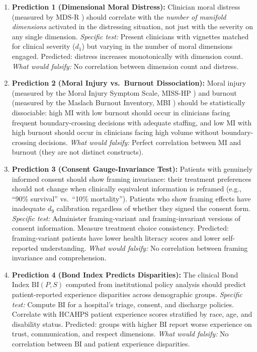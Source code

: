 \documentclass[12pt]{article}
\theoremstyle{definition}
\theoremstyle{remark}
\newcommand{\BI}{\mathrm{BI}}              %
\begin{document}
\begin{enumerate}
    \item \textbf{Prediction 1 (Dimensional Moral Distress):} Clinician moral distress (measured by MDS-R \cite{hamric2012}) should correlate with the \emph{number of manifold dimensions} activated in the distressing situation, not just with the severity on any single dimension.  \emph{Specific test:} Present clinicians with vignettes matched for clinical severity ($d_1$) but varying in the number of moral dimensions engaged.  Predicted: distress increases monotonically with dimension count.  \emph{What would falsify:} No correlation between dimension count and distress.

    \item \textbf{Prediction 2 (Moral Injury vs.\ Burnout Dissociation):} Moral injury (measured by the Moral Injury Symptom Scale, MISS-HP \cite{zhizhong2019}) and burnout (measured by the Maslach Burnout Inventory, MBI \cite{maslach1981}) should be statistically dissociable: high MI with low burnout should occur in clinicians facing frequent boundary-crossing decisions with adequate staffing, and low MI with high burnout should occur in clinicians facing high volume without boundary-crossing decisions.  \emph{What would falsify:} Perfect correlation between MI and burnout (they are not distinct constructs).

    \item \textbf{Prediction 3 (Consent Gauge-Invariance Test):} Patients with genuinely informed consent should show framing invariance: their treatment preferences should not change when clinically equivalent information is reframed (e.g., ``90\% survival'' vs.\ ``10\% mortality'').  Patients who show framing effects have inadequate $d_9$ calibration regardless of whether they signed the consent form.  \emph{Specific test:} Administer framing-variant and framing-invariant versions of consent information.  Measure treatment choice consistency.  Predicted: framing-variant patients have lower health literacy scores and lower self-reported understanding.  \emph{What would falsify:} No correlation between framing invariance and comprehension.

    \item \textbf{Prediction 4 (Bond Index Predicts Disparities):} The clinical Bond Index $\BI(P, S)$ computed from institutional policy analysis should predict patient-reported experience disparities across demographic groups.  \emph{Specific test:} Compute $\BI$ for a hospital's triage, consent, and discharge policies.  Correlate with HCAHPS patient experience scores stratified by race, age, and disability status.  Predicted: groups with higher $\BI$ report worse experience on trust, communication, and respect dimensions.  \emph{What would falsify:} No correlation between $\BI$ and patient experience disparities.


\end{enumerate}
\end{document}
